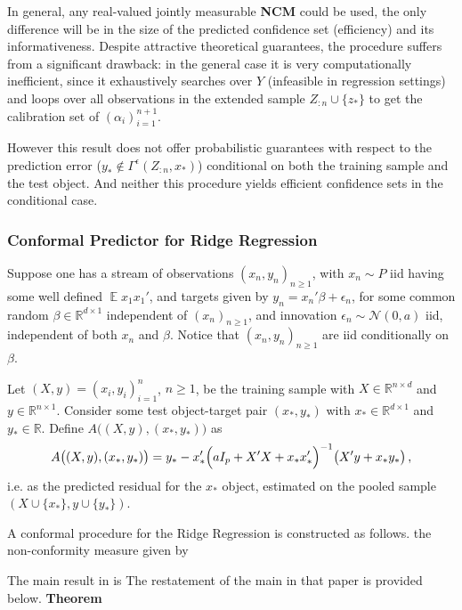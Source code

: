 \documentclass[a4paper,14pt]{article}
\newcommand{\ex}{\mathop{\mathbb{E}}\nolimits}
\newcommand{\Ncal}{\mathcal{N}}
\newcommand{\Real}{\mathbb{R}}
\begin{document}
In general, any real-valued jointly measurable \textbf{NCM} could be used, the only
difference will be in the size of the predicted confidence set (efficiency) and its
informativeness. Despite attractive theoretical guarantees, the procedure suffers
from a significant drawback: in the general case it is very computationally inefficient,
since it exhaustively searches over $Y$ (infeasible in regression settings) and
loops over all observations in the extended sample $Z_{:n}\cup\{z_*\}$ to get
the calibration set of $(\alpha_i)_{i=1}^{n+1}$.

However this result does not offer probabilistic guarantees with respect to the
prediction error ($y_* \notin \Gamma^\epsilon(Z_{:n}, x_*)$) conditional on both
the training sample and the test object. And neither this procedure yields efficient
confidence sets in the conditional case.


\subsubsection{Conformal Predictor for Ridge Regression} %
\label{ssub:conformal_ridge_regression}

Suppose one has a stream of observations $(x_n, y_n)_{n\geq1}$, with $x_n \sim P$ iid
having some well defined $\ex x_1 x_1'$, and targets given by $ y_n = x_n'\beta + \epsilon_n$,
for some common random $\beta \in\Real^{d\times 1}$ independent of $(x_n)_{n\geq1}$,
and innovation $\epsilon_n \sim \Ncal(0, a)$ iid, independent of both $x_n$ and $\beta$.
Notice that $(x_n, y_n)_{n\geq1}$ are iid conditionally on $\beta$.

Let $(X, y) = (x_i, y_i)_{i=1}^n$, $n\geq 1$, be the training sample with $X \in \Real^{n\times d}$
and $y\in \Real^{n\times 1}$. Consider some test object-target pair $(x_*, y_*)$
with $x_*\in \Real^{d\times 1}$ and $y_*\in \Real$. Define $A\bigl((X, y), (x_*, y_*)\bigr)$
as
$$ A\bigl((X, y), (x_*, y_*)\bigr)
  = y_* - x_*' \Bigl( a I_p + X'X + x_* x_*' \Bigr)^{-1}
    \bigl( X'y + x_* y_* \bigr)
  \,, $$
i.e. as the predicted residual for the $x_*$ object, estimated on the pooled sample
$(X \cup\{x_*\}, y \cup\{y_*\})$.

A conformal procedure for the Ridge Regression is constructed as follows.
the non-conformity measure given by 

\noindent The main result in \cite{BurVovk2014} is The restatement of the main in that
paper is provided below.
\noindent\textbf{Theorem \cite{BurVovk2014}}\hfill\\
\end{document}
